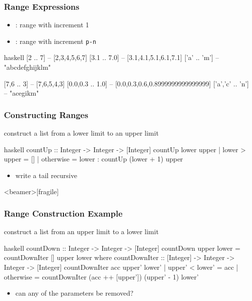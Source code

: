 \documentclass[dvipsnames]{beamer}
\theoremstyle{plain}
\begin{document}
\begin{frame}[fragile]
  \frametitle{Range Expressions}

  \begin{itemize}
    \item {}: range with increment 1
    \item {}: range with increment \texttt{p-n}
  \end{itemize}

  \begin{exampleblock}{}
    \begin{pygments}{haskell}
[2 .. 7]          -- [2,3,4,5,6,7]
[3.1 .. 7.0]      -- [3.1,4.1,5.1,6.1,7.1]
['a' .. 'm']      -- "abcdefghijklm"

[7,6 .. 3]        -- [7,6,5,4,3]
[0.0,0.3 .. 1.0]  -- [0.0,0.3,0.6,0.8999999999999999]
['a','c' .. 'n']  -- "acegikm"
    \end{pygments}
  \end{exampleblock}
\end{frame}

\begin{frame}[fragile]
  \frametitle{Constructing Ranges}

  \begin{exampleblock}{construct a list from a lower limit to an upper limit}
    \begin{pygments}{haskell}
countUp :: Integer -> Integer -> [Integer]
countUp lower upper
  | lower > upper = []
  | otherwise     = lower : countUp (lower + 1) upper
    \end{pygments}
  \end{exampleblock}

  \pause
  \begin{itemize}
    \item write a tail recursive 
  \end{itemize}
\end{frame}

\begin{frame}<beamer>[fragile]
  \frametitle{Range Construction Example}

  \begin{footnotesize}
    \begin{exampleblock}{construct a list from an upper limit to a lower limit}
      \begin{pygments}{haskell}
countDown :: Integer -> Integer -> [Integer]
countDown upper lower = countDownIter [] upper lower
  where
    countDownIter :: [Integer] -> Integer -> Integer -> [Integer]
    countDownIter acc upper' lower'
      | upper' < lower' = acc
      | otherwise       = countDownIter (acc ++ [upper'])
                                        (upper' - 1) lower'
    \end{pygments}
    \end{exampleblock}
  \end{footnotesize}

  \pause
  \begin{itemize}
    \item can any of the parameters be removed?
  \end{itemize}
\end{frame}
\end{document}
